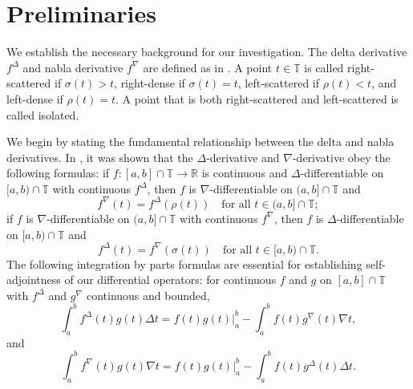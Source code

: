 \documentclass{article}
\numberwithin{equation}{section}
\numberwithin{theorem}{section}
\begin{document}
\section{Preliminaries}\label{sec:prelim}

We establish the necessary background for our investigation. The delta derivative $f^\Delta$ and nabla derivative $f^\nabla$ are defined as in \cite{BoPe}. A point $t \in \mathbb{T}$ is called right-scattered if $\sigma(t) > t$, right-dense if $\sigma(t) = t$, left-scattered if $\rho(t) < t$, and left-dense if $\rho(t) = t$. A point that is both right-scattered and left-scattered is called isolated.


We begin by stating the fundamental relationship between the delta and nabla derivatives. In \cite[Theorems 2.5, 2.6]{Atici-Guseinov-GF}, it was shown that the $\Delta$-derivative and $\nabla$-derivative obey the following formulas: if $f\colon [a,b]\cap\mathbb{T}\to \mathbb{R}$ is continuous and $\Delta$-differentiable on $[a,b)\cap\mathbb{T}$ with continuous $f^\Delta$, then $f$ is $\nabla$-differentiable on $(a,b]\cap\mathbb{T}$ and
\begin{equation}\label{eq:nabla-from-delta}
f^\nabla(t) = f^\Delta(\rho(t)) \quad \text{for all } t \in (a,b]\cap\mathbb{T};
\end{equation}
if $f$ is $\nabla$-differentiable on $(a,b]\cap\mathbb{T}$ with continuous $f^\nabla$, then $f$ is $\Delta$-differentiable on $[a,b)\cap\mathbb{T}$ and
\begin{equation}\label{eq:delta-from-nabla}
f^\Delta(t) = f^\nabla(\sigma(t)) \quad \text{for all } t \in [a,b)\cap\mathbb{T}.
\end{equation}
The following integration by parts formulas \cite[Theorem 2.4]{Guseinov-EF} are essential for establishing self-adjointness of our differential operators: for continuous $f$ and $g$ on $[a,b]\cap\mathbb{T}$ with $f^{\Delta}$ and $g^{\nabla}$ continuous and bounded,
\begin{equation}
\int_a^b f^\Delta(t) g(t) \Delta t = f(t)g(t) \Big|_a^b - \int_a^b f(t) g^\nabla(t) \nabla t, \label{eq:ibp1}
\end{equation}
and
\begin{equation}
\int_a^b f^\nabla(t) g(t) \nabla t = f(t)g(t) \Big|_a^b - \int_a^b f(t) g^\Delta(t) \Delta t. \label{eq:ibp2}
\end{equation}
\end{document}

